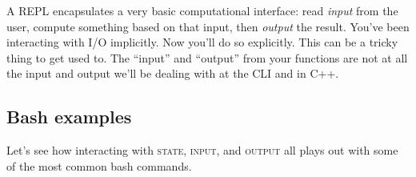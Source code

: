 \documentclass[]{tufte-handout}
\begin{document}
A REPL encapsulates a very basic computational interface: read \textit{input} from the user, compute something based on that input, then \textit{output} the result. You've been interacting with I/O implicitly. Now you'll do so explicitly. This can be a tricky thing to get used to.  The ``input'' and ``output'' from your functions are not at all the input and output we'll be dealing with at the CLI and in C++. 

\subsection{Bash examples}

Let's see how interacting with \textsc{state}, \textsc{input}, and \textsc{output} all plays out with some of the most common bash commands. 
\end{document}

